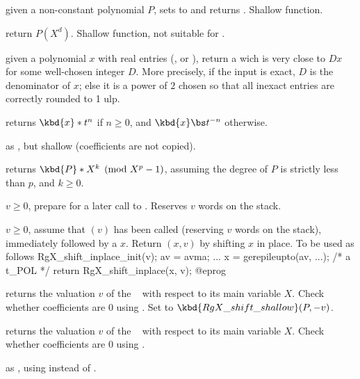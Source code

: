  given a non-constant polynomial
$P$, sets  to  and
returns . Shallow function.

 return $P(X^d)$. Shallow function, not
suitable for .

 given a polynomial $x$ with real entries
(,  or ), return a  wich is very close
to $D x$ for some well-chosen integer $D$. More precisely, if the input is
exact, $D$ is the denominator of $x$; else it is a power of $2$ chosen
so that all inexact entries are correctly rounded to 1 ulp.


 returns $\kbd{x} * t^n$ if $n\geq 0$,
and $\kbd{x} \bs t^{-n}$ otherwise.

 as , but
shallow (coefficients are not copied).

 returns $\kbd{P} * X^k
\pmod {X^p-1}$, assuming the degree of $P$ is strictly less than $p$, and
$k\geq 0$.

 $v \geq 0$, prepare for a later
call to . Reserves $v$ words on the stack.

 $v \geq 0$, assume that
$(v)$ has been called (reserving $v$ words on the
stack), immediately followed by a  $x$. Return $(x,v)$
by shifting $x$ in place. To be used as follows
\bprog
  RgX_shift_inplace_init(v);
  av = avma;
  ...
  x = gerepileupto(av, ...); /* a t_POL */
  return RgX_shift_inplace(x, v);
@eprog

 returns the valuation $v$ of the
~ with respect to its main variable $X$. Check whether
coefficients are $0$ using . Set  to
$\kbd{RgX\_shift\_shallow}(P,-v)$.

 returns the valuation $v$ of the
~ with respect to its main variable $X$. Check whether
coefficients are $0$ using .

 as , using
 instead of .

